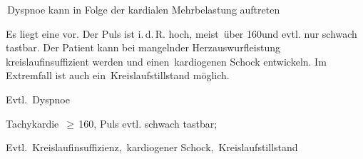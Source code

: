\TextSlide
{\TxABCDE}
{
\begin{ABCDEText}
  \item[\ABCDE{B}] {\RedFlag\,}Dyspnoe kann in Folge der kardialen Mehrbelastung auftreten
  \item[\ABCDE{C}] Es liegt eine  vor. Der Puls
  ist i.\,d.\,R. hoch, meist {\RedFlag\,}über 160\PerMin* und evtl. nur
  schwach tastbar.
  Der Patient kann bei mangelnder Herzauswurfleistung
  {\RedFlag\,}kreislaufinsuffizient werden und einen {\RedFlag\,}kardiogenen Schock
  entwickeln. Im Extremfall ist auch ein {\RedFlag\,}Kreislaufstillstand
  möglich.
\end{ABCDEText}
}
{
\begin{ABCDESlide}
  \item[\ABCDE{B}] Evtl. {\RedFlag\,}Dyspnoe
  \item[\ABCDE{C}] Tachykardie {\RedFlag\,}$\geq$\,160\PerMin*, Puls evtl. schwach tastbar; 
  
  Evtl. {\RedFlag\,}Kreislaufinsuffizienz, {\RedFlag\,}kardiogener Schock, {\RedFlag\,}Kreislaufstillstand
  
\end{ABCDESlide}
}
{
}
{}
{}



